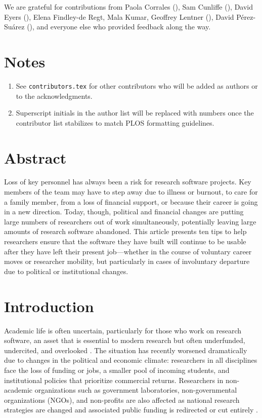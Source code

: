 \documentclass[10pt,letterpaper]{article}
\begin{document}
\noindent
We are grateful for contributions from
Paola Corrales (),
Sam Cunliffe (),
David Eyers (),
Elena Findley-de Regt,
Mala Kumar,
Geoffrey Lentner (),
David Pérez-Suárez (),
and everyone else who provided feedback along the way.

\section*{Notes}

\begin{enumerate}
\item
  See \texttt{contributors.tex} for other contributors who will be added as authors or to the acknowledgments.
\item
  Superscript initials in the author list will be replaced with numbers once the contributor list stabilizes to match PLOS formatting guidelines.
\end{enumerate}

\section*{Abstract}

Loss of key personnel has always been a risk for research software projects.
Key members of the team may have to step away due to illness or burnout,
to care for a family member,
from a loss of financial support,
or because their career is going in a new direction.
Today,
though,
political and financial changes are putting large numbers of researchers out of work simultaneously,
potentially leaving large amounts of research software abandoned.
This article presents ten tips to help researchers ensure that
the software they have built will continue to be usable
after they have left their present job---whether in the course of voluntary career moves or researcher mobility,
but particularly in cases of involuntary departure due to political or institutional changes.

\linenumbers

\section*{Introduction}

Academic life is often uncertain,
particularly for those who work on research software,
an asset that is essential to modern research \cite{Pearson2025}
but often underfunded, undercited, and overlooked \cite{Carver2022}.
The situation has recently worsened dramatically due to changes in the political and economic climate:
researchers in all disciplines face the loss of funding or jobs,
a smaller pool of incoming students,
and institutional policies that prioritize commercial returns.
Researchers in non-academic organizations
such as government laboratories, non-governmental organizations (NGOs), and non-profits are also affected \cite{Woodward2025}
as national research strategies are changed
and associated public funding is redirected or cut entirely \cite{Nature2019,Nature2021,Nature2023,RatRisk2024,Nature2025}.
\end{document}
